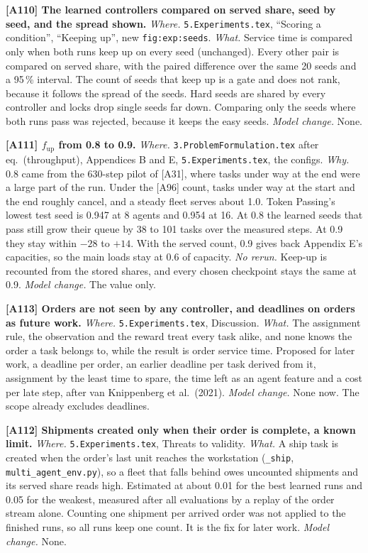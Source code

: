 \documentclass[11pt,a4paper]{article}
\begin{document}
\textbf{[A110] The learned controllers compared on served share, seed by
seed, and the spread shown.} \emph{Where.} \texttt{5.Experiments.tex},
``Scoring a condition'', ``Keeping up'', new \texttt{fig:exp:seeds}.
\emph{What.} Service time is compared only when both runs keep up on every
seed (unchanged). Every other pair is compared on served share, with the
paired difference over the same 20 seeds and a 95\,\% interval. The count of
seeds that keep up is a gate and does not rank, because it follows the
spread of the seeds. Hard seeds are shared by every controller and locks
drop single seeds far down. Comparing only the seeds where both runs pass
was rejected, because it keeps the easy seeds. \emph{Model change.} None.

\textbf{[A111] $f_{\mathrm{up}}$ from 0.8 to 0.9.} \emph{Where.}
\texttt{3.ProblemFormulation.tex} after eq.~(throughput), Appendices B and
E, \texttt{5.Experiments.tex}, the configs. \emph{Why.} 0.8 came from the
630-step pilot of [A31], where tasks under way at the end were a large part
of the run. Under the [A96] count, tasks under way at the start and the end
roughly cancel, and a steady fleet serves about 1.0. Token Passing's lowest
test seed is 0.947 at 8 agents and 0.954 at 16. At 0.8 the learned seeds
that pass still grow their queue by 38 to 101 tasks over the measured
steps. At 0.9 they stay within $-28$ to $+14$. With the served count, 0.9
gives back Appendix E's capacities, so the main loads stay at 0.6 of
capacity. \emph{No rerun.} Keep-up is recounted from the stored shares, and
every chosen checkpoint stays the same at 0.9. \emph{Model change.} The
value only.

\textbf{[A113] Orders are not seen by any controller, and deadlines on
orders as future work.} \emph{Where.} \texttt{5.Experiments.tex},
Discussion. \emph{What.} The assignment rule, the observation and the
reward treat every task alike, and none knows the order a task belongs to,
while the result is order service time. Proposed for later work, a deadline
per order, an earlier deadline per task derived from it, assignment by the
least time to spare, the time left as an agent feature and a cost per late
step, after van Knippenberg et al.\ (2021). \emph{Model change.} None now.
The scope already excludes deadlines.

\textbf{[A112] Shipments created only when their order is complete, a
known limit.} \emph{Where.} \texttt{5.Experiments.tex}, Threats to
validity. \emph{What.} A ship task is created when the order's last unit
reaches the workstation (\texttt{\_ship}, \texttt{multi\_agent\_env.py}), so
a fleet that falls behind owes uncounted shipments and its served share
reads high. Estimated at about 0.01 for the best learned runs and 0.05 for
the weakest, measured after all evaluations by a replay of the order stream
alone. Counting one shipment per arrived order was not applied to the
finished runs, so all runs keep one count. It is the fix for later work.
\emph{Model change.} None.
\end{document}
